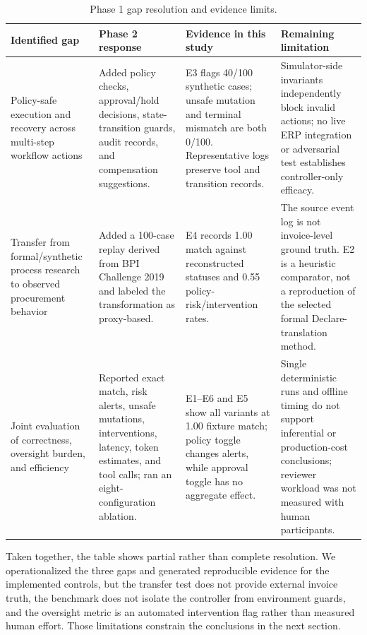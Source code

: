 \documentclass[conference]{IEEEtran}
\begin{document}
\begin{table}[t]
\centering
\scriptsize
\setlength{\tabcolsep}{3pt}
\caption{Phase 1 gap resolution and evidence limits.}
\label{tab:gaps}
\begin{tabular}{p{}p{}p{}p{}}
\toprule
Identified gap & Phase 2 response & Evidence in this study & Remaining limitation \\
\midrule
Policy-safe execution and recovery across multi-step workflow actions &
Added policy checks, approval/hold decisions, state-transition guards, audit records, and compensation suggestions. &
E3 flags 40/100 synthetic cases; unsafe mutation and terminal mismatch are both 0/100. Representative logs preserve tool and transition records. &
Simulator-side invariants independently block invalid actions; no live ERP integration or adversarial test establishes controller-only efficacy. \\
\addlinespace
Transfer from formal/synthetic process research to observed procurement behavior &
Added a 100-case replay derived from BPI Challenge 2019 and labeled the transformation as proxy-based. &
E4 records 1.00 match against reconstructed statuses and 0.55 policy-risk/intervention rates. &
The source event log is not invoice-level ground truth. E2 is a heuristic comparator, not a reproduction of the selected formal Declare-translation method. \\
\addlinespace
Joint evaluation of correctness, oversight burden, and efficiency &
Reported exact match, risk alerts, unsafe mutations, interventions, latency, token estimates, and tool calls; ran an eight-configuration ablation. &
E1--E6 and E5 show all variants at 1.00 fixture match; policy toggle changes alerts, while approval toggle has no aggregate effect. &
Single deterministic runs and offline timing do not support inferential or production-cost conclusions; reviewer workload was not measured with human participants. \\
\bottomrule
\end{tabular}
\end{table}

Taken together, the table shows partial rather than complete resolution. We operationalized the three gaps and generated reproducible evidence for the implemented controls, but the transfer test does not provide external invoice truth, the benchmark does not isolate the controller from environment guards, and the oversight metric is an automated intervention flag rather than measured human effort. Those limitations constrain the conclusions in the next section.
\end{document}
